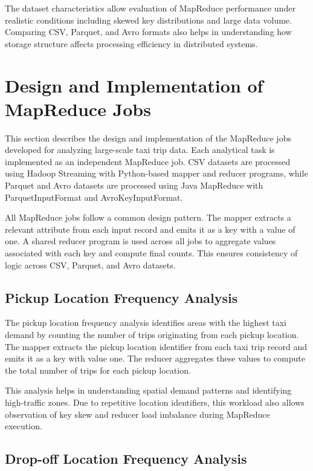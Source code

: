 \documentclass[12pt,a4paper]{report}
\begin{document}
The dataset characteristics allow evaluation of MapReduce performance under realistic
conditions including skewed key distributions and large data volume. Comparing CSV,
Parquet, and Avro formats also helps in understanding how storage structure affects
processing efficiency in distributed systems.
\clearpage 

\section{Design and Implementation of MapReduce Jobs}

This section describes the design and implementation of the MapReduce jobs developed
for analyzing large-scale taxi trip data. Each analytical task is implemented as an
independent MapReduce job. CSV datasets are processed using Hadoop Streaming with
Python-based mapper and reducer programs, while Parquet and Avro datasets are
processed using Java MapReduce with ParquetInputFormat and AvroKeyInputFormat.

All MapReduce jobs follow a common design pattern. The mapper extracts a relevant
attribute from each input record and emits it as a key with a value of one. A shared
reducer program is used across all jobs to aggregate values associated with each key
and compute final counts. This ensures consistency of logic across CSV, Parquet, and
Avro datasets.


\subsection{Pickup Location Frequency Analysis}

The pickup location frequency analysis identifies areas with the highest taxi demand by
counting the number of trips originating from each pickup location. The mapper extracts
the pickup location identifier from each taxi trip record and emits it as a key with value
one. The reducer aggregates these values to compute the total number of trips for each
pickup location.

This analysis helps in understanding spatial demand patterns and identifying high-traffic
zones. Due to repetitive location identifiers, this workload also allows observation of key
skew and reducer load imbalance during MapReduce execution.


\subsection{Drop-off Location Frequency Analysis}
\end{document}
